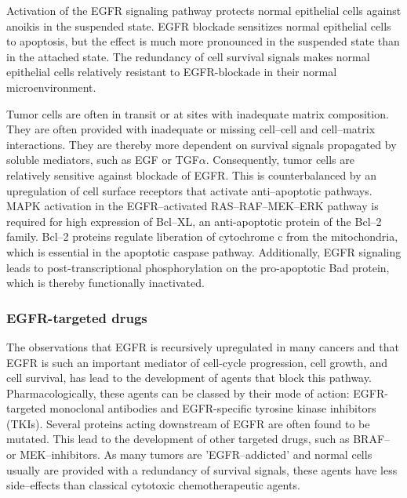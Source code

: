 {{      Activation of the EGFR signaling pathway protects normal epithelial
      cells against anoikis in the suspended state. EGFR blockade sensitizes
      normal epithelial cells to apoptosis, but the effect is much more
      pronounced in the suspended state than in the attached state. The
      redundancy of cell survival signals makes normal epithelial cells
      relatively resistant to EGFR-blockade in their normal microenvironment.

      Tumor cells are often in transit or at sites with inadequate matrix
      composition. They are often provided with inadequate or missing cell--cell
      and cell--matrix interactions. They are thereby more dependent on survival
      signals propagated by soluble mediators, such as EGF or TGF$\alpha$.
      Consequently, tumor cells are relatively sensitive against blockade of
      EGFR. This is counterbalanced by an upregulation of cell surface receptors
      that activate anti--apoptotic pathways. MAPK activation in the
      EGFR--activated RAS--RAF--MEK--ERK pathway is required for high expression
      of Bcl--XL, an anti-apoptotic protein of the Bcl--2 family. Bcl--2
      proteins regulate liberation of cytochrome c from the mitochondria, which
      is essential in the apoptotic caspase pathway. Additionally, EGFR
      signaling leads to post-transcriptional phosphorylation on the
      pro-apoptotic Bad protein, which is thereby functionally inactivated.

    \subsubsection{EGFR-targeted drugs}

      The observations that EGFR is recursively upregulated in many cancers and
      that EGFR is such an important mediator of cell-cycle progression,  cell
      growth, and cell survival, has lead to the development of agents that
      block this pathway. Pharmacologically, these agents can be classed by
      their mode of action: EGFR-targeted monoclonal antibodies and
      EGFR-specific tyrosine kinase inhibitors (TKIs). Several proteins acting
      downstream of EGFR are often found to be mutated. This lead to the
      development of other targeted drugs, such as BRAF-- or MEK--inhibitors.
      As many tumors are 'EGFR--addicted' and normal cells usually are provided
      with a redundancy of survival signals, these agents have less
      side--effects than classical cytotoxic chemotherapeutic agents.

}}

